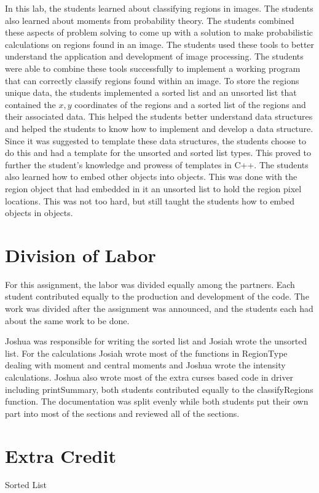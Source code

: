 \documentclass[pdftex, 12pt]{article}
\begin{document}
\begin{description}
		In this lab, the students learned about classifying regions in images. The students also learned about moments from
		probability theory. The students combined these aspects of problem solving to come up with a solution to make
		probabilistic calculations on regions found in an image.  The students used these tools to better understand the
		application and development of image processing. The students were able to combine these tools successfully to implement
		a working program that can correctly classify regions found within an image. To store the regions unique data, the
		students implemented a sorted list and an unsorted list that contained the $x,y$ coordinates of the regions and a sorted
		list of the regions and their associated data. This helped the students better understand data structures and helped the
		students to know how to implement and develop a data structure. Since it was suggested to template these data
		structures, the students choose to do this and had a template for the unsorted and sorted list types. This proved to
		further the student's knowledge and prowess of templates in C++.  The students also learned how to embed other objects
		into objects. This was done with the region object that had embedded in it an unsorted list to hold the region pixel
		locations. This was not too hard, but still taught the students how to embed objects in objects.

		\section{Division of Labor}

		For this assignment, the labor was divided equally among the partners. Each student contributed equally to the
		production and development of the code. The work was divided after the assignment was announced, and the students each
		had about the same work to be done.

		Joshua was responsible for writing the sorted list and Josiah wrote the unsorted list.  For the calculations Josiah
		wrote most of the functions in RegionType dealing with moment and central moments and Joshua wrote the intensity
		calculations.  Joshua also wrote most of the extra curses based code in driver including printSummary, both students
		contributed equally to the classifyRegions function.  The documentation was split evenly while both students put their
		own part into most of the sections and reviewed all of the sections.

		\section{Extra Credit}
		\begin{description}
			\item{Sorted List}


\end{description}
\end{description}
\end{document}
